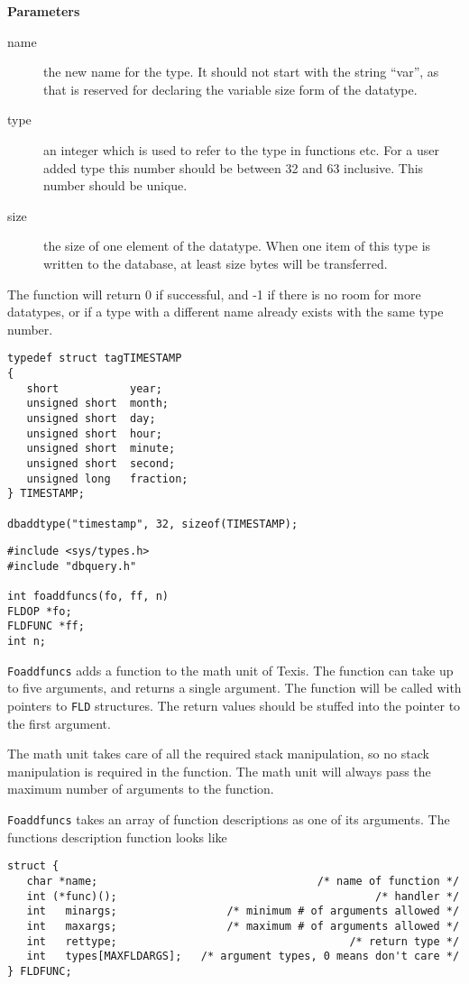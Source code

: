 \DESCRIPTION
{\bf Parameters}
\begin{description}
\item[name] the new name for the type.  It should not start with the
string ``var'', as that is reserved for declaring the variable size
form of the datatype.
\item[type] an integer which is used to refer to the type in functions
etc.  For a user added type this number should be between 32 and 63
inclusive.  This number should be unique.
\item[size] the size of one element of the datatype.  When one item of
this type is written to the database, at least size bytes will be
transferred.
\end{description}

The function will return 0 if successful, and -1 if there is no room
for more datatypes, or if a type with a different name already exists
with the same type number.


\EXAMPLE
\begin{verbatim}
typedef struct tagTIMESTAMP
{
   short           year;
   unsigned short  month;
   unsigned short  day;
   unsigned short  hour;
   unsigned short  minute;
   unsigned short  second;
   unsigned long   fraction;
} TIMESTAMP;

dbaddtype("timestamp", 32, sizeof(TIMESTAMP);
\end{verbatim}


\SYNOPSIS
\begin{verbatim}
#include <sys/types.h>
#include "dbquery.h"

int foaddfuncs(fo, ff, n)
FLDOP *fo;
FLDFUNC *ff;
int n;
\end{verbatim}

\DESCRIPTION

{\tt Foaddfuncs} adds a function to the math unit of Texis.  The function
can take up to five arguments, and returns a single argument.  The function
will be called with pointers to {\tt FLD} structures.  The return values
should be stuffed into the pointer to the first argument.

The math unit takes care of all the required stack manipulation, so no
stack manipulation is required in the function. The math unit will
always pass the maximum number of arguments to the function.

{\tt Foaddfuncs} takes an array of function descriptions as one of its
arguments.  The functions description function looks like
\begin{verbatim}
struct {
   char *name;                                  /* name of function */
   int (*func)();                                        /* handler */
   int   minargs;                 /* minimum # of arguments allowed */
   int   maxargs;                 /* maximum # of arguments allowed */
   int   rettype;                                    /* return type */
   int   types[MAXFLDARGS];   /* argument types, 0 means don't care */
} FLDFUNC;
\end{verbatim}

